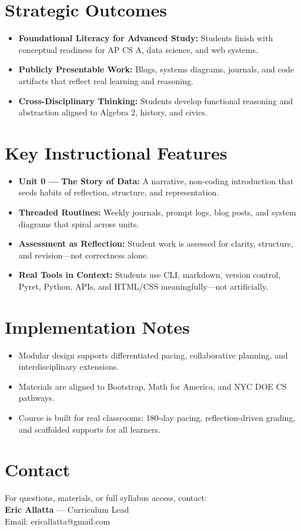 \documentclass[11pt]{article}
\begin{document}
\section*{Strategic Outcomes}
\begin{itemize}[leftmargin=*]
  \item \textbf{Foundational Literacy for Advanced Study:} Students finish with conceptual readiness for AP CS A, data science, and web systems.
  \item \textbf{Publicly Presentable Work:} Blogs, systems diagrams, journals, and code artifacts that reflect real learning and reasoning.
  \item \textbf{Cross-Disciplinary Thinking:} Students develop functional reasoning and abstraction aligned to Algebra 2, history, and civics.
\end{itemize}

\section*{Key Instructional Features}
\begin{itemize}[leftmargin=*]
  \item \textbf{Unit 0 — The Story of Data:} A narrative, non-coding introduction that seeds habits of reflection, structure, and representation.
  \item \textbf{Threaded Routines:} Weekly journals, prompt logs, blog posts, and system diagrams that spiral across units.
  \item \textbf{Assessment as Reflection:} Student work is assessed for clarity, structure, and revision—not correctness alone.
  \item \textbf{Real Tools in Context:} Students use CLI, markdown, version control, Pyret, Python, APIs, and HTML/CSS meaningfully—not artificially.
\end{itemize}

\section*{Implementation Notes}
\begin{itemize}[leftmargin=*]
  \item Modular design supports differentiated pacing, collaborative planning, and interdisciplinary extensions.
  \item Materials are aligned to Bootstrap, Math for America, and NYC DOE CS pathways.
  \item Course is built for real classrooms: 180-day pacing, reflection-driven grading, and scaffolded supports for all learners.
\end{itemize}

\section*{Contact}
For questions, materials, or full syllabus access, contact: \\[0.25em]
\textbf{Eric Allatta} — Curriculum Lead \\ Email: ericallatta@gmail.com
\end{document}
